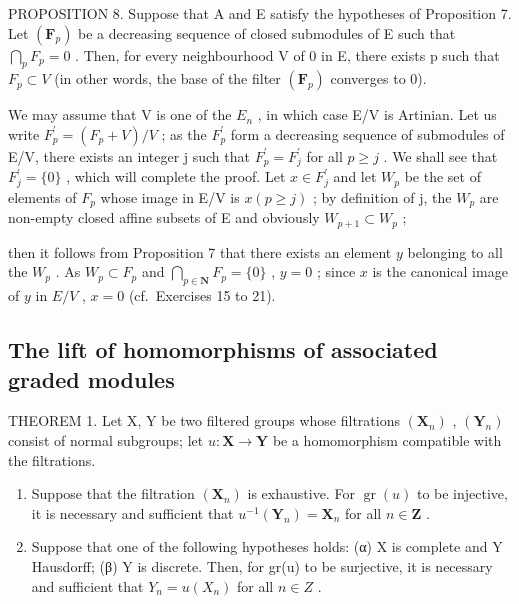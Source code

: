 PROPOSITION 8. Suppose that A and E satisfy the hypotheses of Proposition 7. Let \((\mathbf{F}_{p})\) be a decreasing sequence of closed submodules of E such that \(\bigcap_{p} F_{p} = 0\) . Then, for every neighbourhood V of 0 in E, there exists p such that \(F_{p} \subset V\) (in other words, the base of the filter \((\mathbf{F}_{p})\) converges to 0).

We may assume that V is one of the \(E_{n}\) , in which case E/V is Artinian. Let us write \(F_{p}^{\prime} = (F_{p} + V)/V\) ; as the \(F_{p}^{\prime}\) form a decreasing sequence of submodules of E/V, there exists an integer j such that \(F_{p}^{\prime} = F_{j}^{\prime}\) for all \(p \geqslant j\) . We shall see that \(F_{j}^{\prime} = \{0\}\) , which will complete the proof. Let \(x \in F_{j}^{\prime}\) and let \(W_{p}\) be the set of elements of \(F_{p}\) whose image in E/V is \(x (p \geqslant j)\) ; by definition of j, the \(W_{p}\) are non-empty closed affine subsets of E and obviously \(W_{p+1} \subset W_{p}\) ;

then it follows from Proposition 7 that there exists an element \(y\) belonging to all the \(W_p\) . As \(W_p \subset F_p\) and \(\bigcap_{p \in \mathbf{N}} F_p = \{0\}\) , \(y = 0\) ; since \(x\) is the canonical image of \(y\) in \(E / V\) , \(x = 0\) (cf.~Exercises 15 to 21).

\subsection{The lift of homomorphisms of associated graded modules}

THEOREM 1. Let X, Y be two filtered groups whose filtrations \((\mathbf{X}_n)\) , \((\mathbf{Y}_n)\) consist of normal subgroups; let \(u: \mathbf{X} \to \mathbf{Y}\) be a homomorphism compatible with the filtrations.

\begin{enumerate}
\def\labelenumi{(\roman{enumi})}
\item
  Suppose that the filtration \((\mathbf{X}_n)\) is exhaustive. For \(\operatorname{gr}(u)\) to be injective, it is necessary and sufficient that \(u^{-1}(\mathbf{Y}_n) = \mathbf{X}_n\) for all \(n \in \mathbf{Z}\) .
\item
  Suppose that one of the following hypotheses holds: (α) X is complete and Y Hausdorff; (β) Y is discrete. Then, for gr(u) to be surjective, it is necessary and sufficient that \(Y_{n} = u(X_{n})\) for all \(n \in Z\) .
\end{enumerate}

